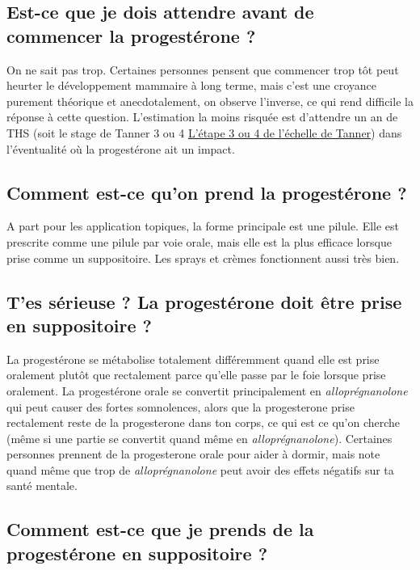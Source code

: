 \documentclass{article}
\begin{document}
\subsection{Est-ce que je dois attendre avant de commencer la progestérone ?}

On ne sait pas trop. Certaines personnes pensent que commencer trop tôt peut heurter le développement mammaire à long terme, mais c'est une croyance purement théorique et anecdotalement, on observe l'inverse, ce qui rend difficile la réponse à cette question. L'estimation la moins risquée est d'attendre un an de THS (soit le stage de Tanner 3 ou 4 \href{https://en.wikipedia.org/wiki/File:Tanner_scale-female.svg}{L'étape 3 ou 4 de l'échelle de Tanner}) dans l'éventualité où la progestérone ait un impact.

\subsection{Comment est-ce qu'on prend la progestérone ?}

A part pour les application topiques, la forme principale est une pilule. Elle est prescrite comme une pilule par voie orale, mais elle est la plus efficace lorsque prise comme un suppositoire. Les sprays et crèmes fonctionnent aussi très bien.

\subsection{T'es sérieuse ? La progestérone doit être prise en suppositoire ?}

La progestérone se métabolise totalement différemment quand elle est prise oralement plutôt que rectalement parce qu'elle passe par le foie lorsque prise oralement. La progestérone orale se convertit principalement en \textit{alloprégnanolone} qui peut causer des fortes somnolences, alors que la progesterone prise rectalement reste de la progesterone dans ton corps, ce qui est ce qu'on cherche (même si une partie se convertit quand même en \textit{alloprégnanolone}). Certaines personnes prennent de la progesterone orale pour aider à dormir, mais note quand même que trop de \textit{alloprégnanolone} peut avoir des effets négatifs sur ta santé mentale.

\subsection{Comment est-ce que je prends de la progestérone en suppositoire ?}
\end{document}
